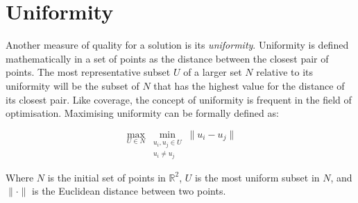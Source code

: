 \paragraph{}
\section{Uniformity}
Another measure of quality for a solution is its \emph{uniformity}. Uniformity is defined mathematically in a set of points as the distance between the closest pair of points. The most representative subset $U$ of a larger set $N$ relative to its uniformity will be the subset of $N$ that has the highest value for the distance of its closest pair. Like coverage, the concept of uniformity is frequent in the field of optimisation. Maximising uniformity can be formally defined as:

\begin{equation}
\max_{U \in N}{\min_{\substack{u_i,u_j \in U \\ u_i \neq u_j}}{\lVert u_i-u_j \rVert}}
\end{equation}

\noindent
Where $N$ is the initial set of points in $\mathbb{R}^2$, $U$ is the most uniform subset in $N$, and $\lVert \cdot \rVert$ is the Euclidean distance between two points.
